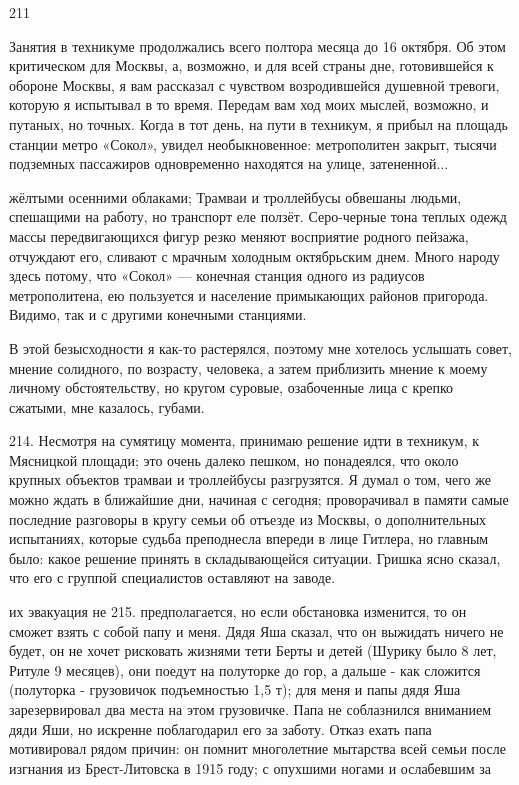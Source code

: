 211

Занятия в техникуме продолжались всего полтора месяца до 16 октября. Об этом критическом для Москвы, а, возможно, и для всей страны дне, готовившейся к обороне Москвы, я вам рассказал с чувством возродившейся душевной тревоги, которую я испытывал в то время. Передам вам ход моих мыслей, возможно, и путаных, но точных. Когда в тот день, на пути в техникум, я прибыл на площадь станции метро «Сокол», увидел необыкновенное: метрополитен закрыт, тысячи подземных пассажиров одновременно находятся на улице, затененной...

жёлтыми осенними облаками; Трамваи и троллейбусы обвешаны людьми, спешащими на работу, но транспорт еле ползёт. Серо-черные тона теплых одежд массы передвигающихся фигур резко меняют восприятие родного пейзажа, отчуждают его, сливают с мрачным холодным октябрьским днем. Много народу здесь потому, что «Сокол» — конечная станция одного из радиусов метрополитена, ею пользуется и население примыкающих районов пригорода. Видимо, так и с другими конечными станциями.

В этой безысходности я как-то растерялся, поэтому мне хотелось услышать совет, мнение солидного, по возрасту, человека, а затем приблизить мнение к моему личному обстоятельству, но кругом суровые, озабоченные лица с крепко сжатыми, мне казалось, губами.

214. Несмотря на сумятицу момента, принимаю решение идти в техникум, к Мясницкой площади; это очень далеко пешком, но понадеялся, что около крупных объектов трамваи и троллейбусы разгрузятся. Я думал о том, чего же можно ждать в ближайшие дни, начиная с сегодня; проворачивал в памяти самые последние разговоры в кругу семьи об отъезде из Москвы, о дополнительных испытаниях, которые судьба преподнесла впереди в лице Гитлера, но главным было: какое решение принять в складывающейся ситуации. Гришка ясно сказал, что его с группой специалистов оставляют на заводе.

их эвакуация не 215. предполагается, но если обстановка изменится, то он сможет взять с собой папу и меня. Дядя Яша сказал, что он выжидать ничего не будет, он не хочет рисковать жизнями тети Берты и детей (Шурику было 8 лет, Ритуле 9 месяцев), они поедут на полуторке до гор, а дальше - как сложится (полуторка - грузовичок подъемностью 1,5 т); для меня и папы дядя Яша зарезервировал два места на этом грузовичке. Папа не соблазнился вниманием дяди Яши, но искренне поблагодарил его за заботу. Отказ ехать папа мотивировал рядом причин: он помнит многолетние мытарства всей семьи после изгнания из Брест-Литовска в 1915 году; с опухшими ногами и ослабевшим за

